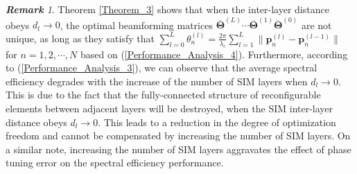 \documentclass[lettersize,journal]{IEEEtran}
\theoremstyle{remark}
\newtheorem{remark}{\quad \textbf{Remark}}
\begin{document}
\begin{remark}\label{Remark_2}
Theorem \ref{Theorem_3} shows that when the inter-layer distance obeys $d_l\rightarrow 0$, the optimal beamforming matrices $\overline{\mathbf{\Theta}}^{(L)}\cdots\overline{\mathbf{\Theta}}^{(1)}
\overline{\mathbf{\Theta}}^{(0)}$ are not unique, as long as they satisfy that $\sum_{l=0}^{L}\theta_n^{(l)}=\frac{2\pi}{\lambda_\mathrm{c}}
\sum_{l=1}^{L}\|\mathbf{p}_{n}^{(l)}-\mathbf{p}_{n}^{(l-1)}\|$ for $n=1,2,\cdots,N$ based on (\ref{Performance_Analysis_4}). Furthermore, according to (\ref{Performance_Analysis_3}), we can observe that the average spectral efficiency degrades with the increase of the number of SIM layers when $d_l\rightarrow 0$. This is due to the fact that the fully-connected structure of reconfigurable elements between adjacent layers will be destroyed, when the SIM inter-layer distance obeys $d_l\rightarrow 0$. This leads to a reduction in the degree of optimization freedom and cannot be compensated by increasing the number of SIM layers. On a similar note, increasing the number of SIM layers aggravates the effect of phase tuning error on the spectral efficiency performance.
\end{remark}


\end{document}

